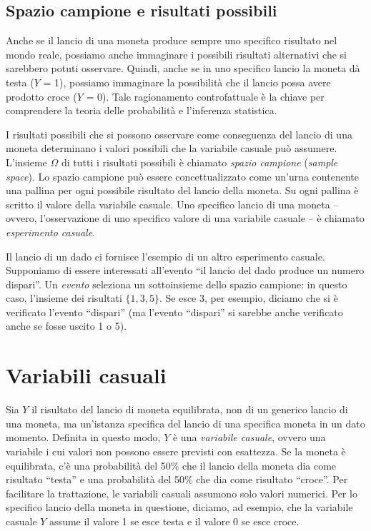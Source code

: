 \documentclass[
  11pt,
]{krantz}
\theoremstyle{definition}
\theoremstyle{definition}
\theoremstyle{definition}
\theoremstyle{definition}
\theoremstyle{remark}
\begin{document}
\hypertarget{spazio-campione-e-risultati-possibili}{%
\subsection{Spazio campione e risultati possibili}\label{spazio-campione-e-risultati-possibili}}

Anche se il lancio di una moneta produce sempre uno specifico risultato nel mondo reale, possiamo anche immaginare i possibili risultati alternativi che si sarebbero potuti osservare. Quindi, anche se in uno specifico lancio la moneta dà testa (\(Y\) = 1), possiamo immaginare la possibilità che il lancio possa avere prodotto croce (\(Y\) = 0). Tale ragionamento controfattuale è la chiave per comprendere la teoria delle probabilità e l'inferenza statistica.

I risultati possibili che si possono osservare come conseguenza del lancio di una moneta determinano i valori possibili che la variabile casuale può assumere. L'insieme \(\Omega\) di tutti i risultati possibili è chiamato \emph{spazio campione} (\emph{sample space}). Lo spazio campione può essere concettualizzato come un'urna contenente una pallina per ogni possibile risultato del lancio della moneta. Su ogni pallina è scritto il valore della variabile casuale. Uno specifico lancio di una moneta -- ovvero, l'osservazione di uno specifico valore di una variabile casuale -- è chiamato \emph{esperimento casuale}.

Il lancio di un dado ci fornisce l'esempio di un altro esperimento casuale. Supponiamo di essere interessati all'evento ``il lancio del dado produce un numero dispari''. Un \emph{evento} seleziona un sottoinsieme dello spazio campione: in questo caso, l'insieme dei risultati \(\{1, 3, 5\}\). Se esce 3, per esempio, diciamo che si è verificato l'evento ``dispari'' (ma l'evento ``dispari'' si sarebbe anche verificato anche se fosse uscito 1 o 5).

\hypertarget{variabili-casuali}{%
\section{Variabili casuali}\label{variabili-casuali}}

Sia \(Y\) il risultato del lancio di moneta equilibrata, non di un generico lancio di una moneta, ma un'istanza specifica del lancio di una specifica moneta in un dato momento. Definita in questo modo, \(Y\) è una \emph{variabile casuale}, ovvero una variabile i cui valori non possono essere previsti con esattezza. Se la moneta è equilibrata, c'è una probabilità del 50\% che il lancio della moneta dia come risultato ``testa'' e una probabilità del 50\% che dia come risultato ``croce''. Per facilitare la trattazione, le variabili casuali assumono solo valori numerici. Per lo specifico lancio della moneta in questione, diciamo, ad esempio, che la variabile casuale \(Y\) assume il valore 1 se esce testa e il valore 0 se esce croce.
\end{document}
